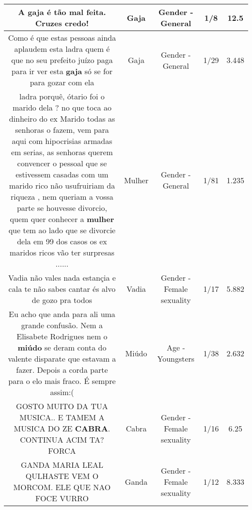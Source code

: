 \documentclass[11pt]{article}
\newlength\mylength
\begin{document}
\begin{center}
\begin{longtable}{|C{.65\mylength}|C{.30\mylength}|C{.12\mylength}|C{.12\mylength}|C{.12\mylength}|}
  \small A \textbf{gaja} é tão mal feita. Cruzes credo!\normalsize   & Gaja & Gender - General & 1/8 & 12.5 \\  \hline
  \small Como é que estas pessoas ainda aplaudem esta ladra quem é que no seu prefeito juízo paga para ir ver esta \textbf{gaja} só se for para gozar com ela\normalsize   & Gaja & Gender - General & 1/29 & 3.448 \\  \hline
  \small ladra porquê,  ótario foi o marido  dela ? no que  toca ao dinheiro  do ex Marido  todas as senhoras o fazem,  vem para aqui com  hipocrisias armadas em serias, as senhoras querem convencer o pessoal  que se estivessem casadas com um marido rico não usufruiriam da riqueza , nem queriam a vossa parte se houvesse divorcio, quem quer conhecer a \textbf{mulher} que tem ao lado que se divorcie dela em 99 dos casos  os ex maridos ricos  vão ter surpresas    ......\normalsize   & Mulher & Gender - General & 1/81 & 1.235 \\  \hline
  \small Vadia não vales nada estançia e cala te não sabes cantar és alvo de gozo pra todos\normalsize   & Vadia & Gender - Female sexuality & 1/17 & 5.882 \\  \hline
  \small Eu acho que anda para ali uma grande confusão. Nem a Elisabete Rodrigues nem o \textbf{miúdo} se deram conta do valente disparate que estavam a fazer. Depois a corda parte para o elo mais fraco. É sempre assim:(\normalsize   & Miúdo & Age - Youngsters & 1/38 & 2.632 \\  \hline
  \small GOSTO MUITO DA TUA MUSICA.. E TAMEM A MUSICA DO ZE \textbf{CABRA}. CONTINUA ACIM TA? FORCA\normalsize   & Cabra & Gender - Female sexuality & 1/16 & 6.25 \\  \hline
  \small GANDA MARIA LEAL QULHASTE VEM O MORCOM. ELE QUE NAO FOCE VURRO\normalsize   & Ganda & Gender - Female sexuality & 1/12 & 8.333 \\  \hline

\end{longtable}
\end{center}
\end{document}
